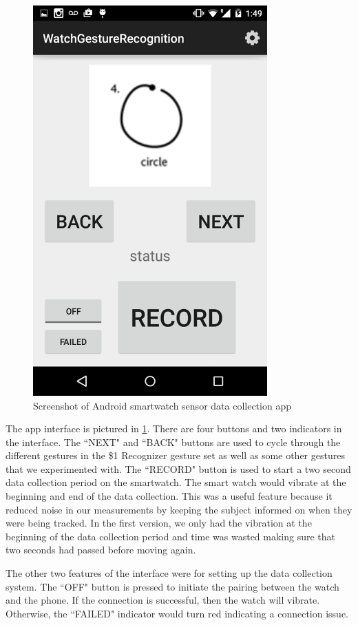 \documentclass{report}
\begin{document}
\begin{figure}[ht!]
  \label{app}
  \centering
  \includegraphics[width=90mm]{app}
  \caption{Screenshot of Android smartwatch sensor data collection app}
\end{figure}


The app interface is pictured in \ref{app}. There are four buttons and two indicators in the interface. The ``NEXT" and ``BACK" buttons are used to cycle through the different gestures in the \$1 Recognizer gesture set as well as some other gestures that we experimented with. The ``RECORD" button is used to start a two second data collection period on the smartwatch. The smart watch would vibrate at the beginning and end of the data collection. This was a useful feature because it reduced noise in our measurements by keeping the subject informed on when they were being tracked. In the first version, we only had the vibration at the beginning of the data collection period and time was wasted making sure that two seconds had passed before moving again.

The other two features of the interface were for setting up the data collection system. The ``OFF" button is pressed to initiate the pairing between the watch and the phone. If the connection is successful, then the watch will vibrate. Otherwise, the ``FAILED" indicator would turn red indicating a connection issue.
\end{document}
